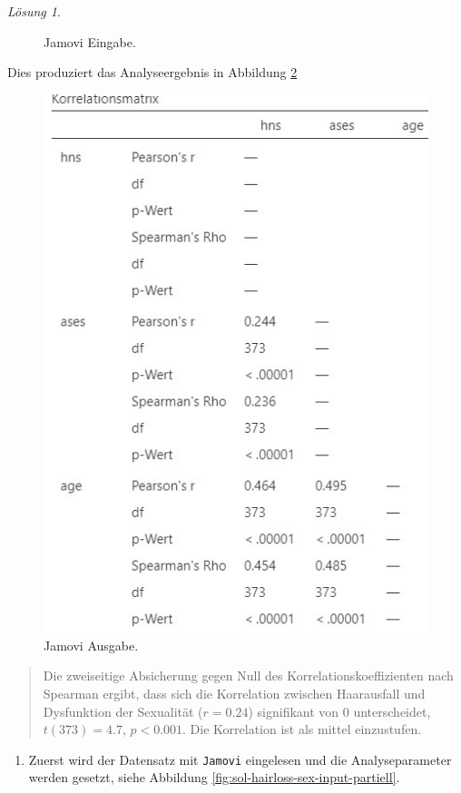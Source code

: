 \documentclass[
]{book}
\providecommand{\tightlist}{%
  \setlength{\itemsep}{0pt}\setlength{\parskip}{0pt}}
\theoremstyle{definition}
\theoremstyle{definition}
\theoremstyle{definition}
\theoremstyle{definition}
\theoremstyle{remark}
\newtheorem*{solution}{Lösung}
\begin{document}
\begin{solution}
\begin{figure}
{}

\caption{Jamovi Eingabe.}\label{fig:sol-hairloss-sex-input-spearman}
\end{figure}

Dies produziert das Analyseergebnis in Abbildung \ref{fig:sol-hairloss-sex-output-spearman}

\begin{figure}

{\centering \includegraphics[width=0.5\linewidth]{figures/08-exr-hairloss-sex-jmv-output-spearman} 

}

\caption{Jamovi Ausgabe.}\label{fig:sol-hairloss-sex-output-spearman}
\end{figure}

\begin{quote}
Die zweiseitige Absicherung gegen Null des Korrelationskoeffizienten nach Spearman ergibt, dass sich die Korrelation zwischen Haarausfall und Dysfunktion der Sexualität (\(r = 0.24\)) signifikant von \(0\) unterscheidet, \(t(373) = 4.7\), \(p < 0.001\). Die Korrelation ist als mittel einzustufen.
\end{quote}

\begin{enumerate}
\def\labelenumi{\alph{enumi})}
\setcounter{enumi}{2}
\tightlist
\item
  Zuerst wird der Datensatz mit \texttt{Jamovi} eingelesen und die Analyseparameter werden gesetzt, siehe Abbildung \ref{fig:sol-hairloss-sex-input-partiell}.
\end{enumerate}

\begin{figure}


\end{figure}
\end{solution}
\end{document}
